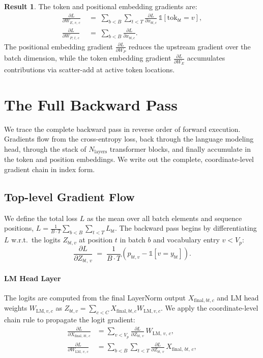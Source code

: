 \documentclass[letterpaper, 10 pt, conference]{ieeeconf}
\newcommand{\pdv}[2]{\frac{\partial #1}{\partial #2}}
\newcommand{\dL}[1]{\pdv{L}{#1}}
\newcommand{\ind}[1]{\mathbb{1}\!\left[#1\right]}
\theoremstyle{definition}
\newtheorem*{result}{Result}
\begin{document}
\begin{result}
  The token and positional embedding gradients are:
  \begin{align}
    \dL{W_{E,\, v,\, c}} \; & =\; \sum_{b<B} \sum_{t<T} \dL{x_{bt, c}}\,\ind{\mathrm{tok}_{bt} = v}, \label{eq:enc-we-bwd} \\
    \dL{W_{P,\, t,\, c}} \; & =\; \sum_{b<B} \dL{x_{bt, c}}. \label{eq:enc-wp-bwd}
  \end{align}
  The positional embedding gradient $\dL{W_P}$ reduces the upstream gradient over the batch dimension, while the token embedding gradient $\dL{W_E}$ accumulates contributions via scatter-add at active token locations.
\end{result}

\section{The Full Backward Pass}\label{sec:full}

We trace the complete backward pass in reverse order of forward execution. Gradients flow from the cross-entropy loss, back through the language modeling head, through the stack of $N_{\text{layers}}$ transformer blocks, and finally accumulate in the token and position embeddings. We write out the complete, coordinate-level gradient chain in index form.

\subsection{Top-level Gradient Flow}

We define the total loss $L$ as the mean over all batch elements and sequence positions, $L = \frac{1}{B \cdot T} \sum_{b<B} \sum_{t<T} L_{bt}$. The backward pass begins by differentiating $L$ w.r.t.\ the logits $Z_{bt, v}$ at position $t$ in batch $b$ and vocabulary entry $v < V_p$:
\begin{equation}
  \dL{Z_{bt,\, v}} \;=\; \frac{1}{B \cdot T} \left( p_{bt, v} - \ind{v = y_{bt}} \right).
  \label{eq:full-dlogits}
\end{equation}

\paragraph{LM Head Layer}
The logits are computed from the final LayerNorm output $X_{\text{final}, bt, c}$ and LM head weights $W_{\text{LM}, v, c}$ as $Z_{bt, v} = \sum_{c<C} X_{\text{final}, bt, c} W_{\text{LM}, v, c}$. We apply the coordinate-level chain rule to propagate the logit gradient:
\begin{align}
  \dL{X_{\text{final},\, bt,\, c}}
   & = \sum_{v<V_p} \dL{Z_{bt,\, v}}\,W_{\text{LM},\, v,\, c},
  \label{eq:full-dxfinal}                                                   \\
  \dL{W_{\text{LM},\, v,\, c}}
   & = \sum_{b<B} \sum_{t<T} \dL{Z_{bt,\, v}}\,X_{\text{final},\, bt,\, c},
  \label{eq:full-dwlm}
\end{align}
\end{document}
